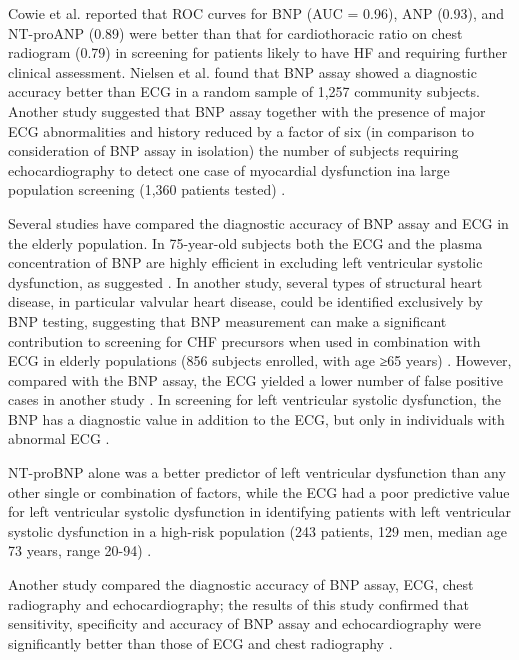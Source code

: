 \documentclass[14pt,a4paper,onecolumn]{extarticle}
\begin{document}
Cowie et al. \citep{bib3110} reported that ROC curves for BNP (AUC = 0.96), ANP (0.93), and NT-proANP (0.89) were better than that for cardiothoracic ratio on chest radiogram (0.79) in screening for patients likely to have HF and requiring further clinical assessment. Nielsen et al. \citep{bib392} found that BNP assay showed a diagnostic accuracy better than ECG in a random sample of 1,257 community subjects.  Another study suggested that BNP assay together with the presence of major ECG abnormalities and history reduced by a factor of six (in comparison to consideration of BNP assay in isolation) the number of subjects requiring echocardiography to detect one case of myocardial dysfunction ina large population screening (1,360 patients tested) \citep{bib3171}.

Several studies have compared the diagnostic accuracy of BNP assay and ECG in the elderly population. In 75-year-old subjects both the ECG and the plasma concentration of BNP are highly efficient in excluding left ventricular systolic dysfunction, as  suggested \citep{bib3173}. In another study, several types of structural heart disease, in particular valvular heart disease, could be identified exclusively by BNP testing, suggesting that BNP measurement can make a significant contribution to screening for CHF precursors when used in combination with ECG in elderly populations (856 subjects enrolled, with age ≥65 years) \citep{bib3174}. However, compared with the BNP assay, the ECG yielded a lower number of false positive cases in another study \citep{bib3172}. In screening for left ventricular systolic dysfunction, the BNP has a diagnostic value in addition to the ECG, but only in individuals with abnormal ECG \citep{bib3172}.

NT-proBNP alone was a better predictor of left ventricular dysfunction than any other single or combination of factors, while the ECG had a poor predictive value for left ventricular systolic dysfunction in identifying patients with left ventricular systolic  dysfunction in a high-risk population (243 patients, 129 men, median age 73 years, range 20-94) \citep{bib3173}.

Another study \citep{bib3170} compared the diagnostic accuracy of BNP assay, ECG, chest radiography and echocardiography; the results of this study confirmed that sensitivity, specificity and accuracy of BNP assay and echocardiography were significantly better than those of ECG and chest radiography \citep{bib3170}.
\end{document}
